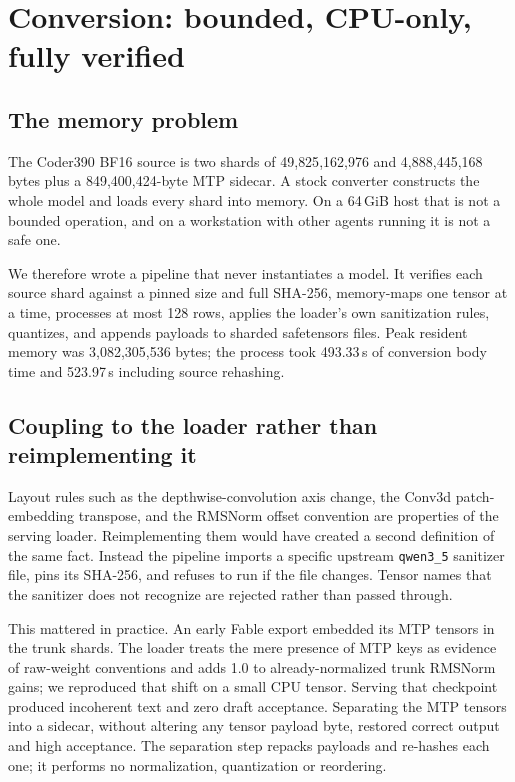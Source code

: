 \documentclass[11pt]{article}
\begin{document}
\section{Conversion: bounded, CPU-only, fully verified}
\subsection{The memory problem}
The Coder390 BF16 source is two shards of 49{,}825{,}162{,}976 and 4{,}888{,}445{,}168 bytes plus a 849{,}400{,}424-byte MTP sidecar. A stock converter constructs the whole model and loads every shard into memory. On a 64\,GiB host that is not a bounded operation, and on a workstation with other agents running it is not a safe one.

We therefore wrote a pipeline that never instantiates a model. It verifies each source shard against a pinned size and full SHA-256, memory-maps one tensor at a time, processes at most 128 rows, applies the loader's own sanitization rules, quantizes, and appends payloads to sharded safetensors files. Peak resident memory was 3{,}082{,}305{,}536 bytes; the process took 493.33\,s of conversion body time and 523.97\,s including source rehashing.

\subsection{Coupling to the loader rather than reimplementing it}
Layout rules such as the depthwise-convolution axis change, the Conv3d patch-embedding transpose, and the RMSNorm offset convention are properties of the serving loader. Reimplementing them would have created a second definition of the same fact. Instead the pipeline imports a specific upstream \texttt{qwen3\_5} sanitizer file, pins its SHA-256, and refuses to run if the file changes. Tensor names that the sanitizer does not recognize are rejected rather than passed through.

This mattered in practice. An early Fable export embedded its MTP tensors in the trunk shards. The loader treats the mere presence of MTP keys as evidence of raw-weight conventions and adds 1.0 to already-normalized trunk RMSNorm gains; we reproduced that shift on a small CPU tensor. Serving that checkpoint produced incoherent text and zero draft acceptance. Separating the MTP tensors into a sidecar, without altering any tensor payload byte, restored correct output and high acceptance. The separation step repacks payloads and re-hashes each one; it performs no normalization, quantization or reordering.
\end{document}
